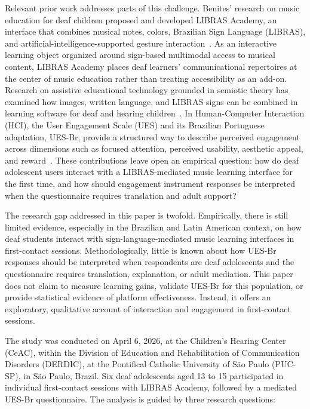 \documentclass{llncs}
\begin{document}
Relevant prior work addresses parts of this challenge. Benites' research on music
education for deaf children proposed and developed LIBRAS Academy, an interface that
combines musical notes, colors, Brazilian Sign Language (LIBRAS), and
artificial-intelligence-supported gesture interaction~\cite{benites2024,benites2024laclo}.
As an interactive learning object organized around sign-based multimodal access to
musical content, LIBRAS Academy places deaf learners' communicational repertoires at
the center of music education rather than treating accessibility as an add-on.
Research on assistive educational technology grounded in semiotic theory has examined how
images, written language, and LIBRAS signs can be combined in learning software for deaf
and hearing children~\cite{rocha2016,rocha2023uais}. In Human-Computer Interaction (HCI),
the User Engagement Scale (UES) and its Brazilian Portuguese adaptation, UES-Br, provide
a structured way to describe perceived engagement across dimensions such as focused
attention, perceived usability, aesthetic appeal, and
reward~\cite{obrien2010ues,miranda2021uesbr}. These contributions leave open an empirical
question: how do deaf adolescent users interact with a LIBRAS-mediated music learning
interface for the first time, and how should engagement instrument responses be
interpreted when the questionnaire requires translation and adult support?

The research gap addressed in this paper is twofold. Empirically, there is still limited
evidence, especially in the Brazilian and Latin American context, on how deaf students
interact with sign-language-mediated music learning interfaces in first-contact sessions.
Methodologically, little is known about how UES-Br responses should be interpreted when
respondents are deaf adolescents and the questionnaire requires translation, explanation,
or adult mediation. This paper does not claim to measure learning gains, validate UES-Br
for this population, or provide statistical evidence of platform effectiveness. Instead,
it offers an exploratory, qualitative account of interaction and engagement in
first-contact sessions.

The study was conducted on April 6, 2026, at the Children's Hearing Center (CeAC),
within the Division of Education and Rehabilitation of Communication Disorders (DERDIC),
at the Pontifical Catholic University of São Paulo (PUC-SP), in São Paulo, Brazil. Six
deaf adolescents aged 13 to 15 participated in individual first-contact sessions with
LIBRAS Academy, followed by a mediated UES-Br questionnaire. The analysis is guided by
three research questions:
\end{document}
